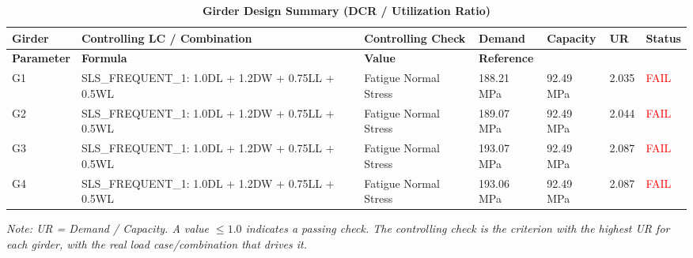 \documentclass[12pt,a4paper]{report}
\numberwithin{table}{chapter}
\numberwithin{figure}{chapter}
\begin{document}
\begin{longtable}{|C{1.6cm}|>{\centering\arraybackslash}p{3.6cm}|C{2.4cm}|C{2.0cm}|C{2.1cm}|C{1.7cm}|C{1.5cm}|}
\caption{\textbf{Girder Design Summary (DCR / Utilization Ratio)}}
\hline
\textbf{Girder} & \textbf{Controlling LC / Combination} & \textbf{Controlling Check} & \textbf{Demand} & \textbf{Capacity} & \textbf{UR} & \textbf{Status} \\[6pt]
\hline
\endfirsthead

\hline

\textbf{Parameter} & \textbf{Formula} & \textbf{Value} & \textbf{Reference} \\[6pt]

\hline

\endhead
G1 & SLS\_\allowbreak{}FREQUENT\_\allowbreak{}1:\allowbreak{} 1.0DL + 1.2DW + 0.75LL + 0.5WL & Fatigue Normal Stress & 188.21 MPa & 92.49 MPa & 2.035 & \textcolor{red}{FAIL} \\[6pt]
\hline
G2 & SLS\_\allowbreak{}FREQUENT\_\allowbreak{}1:\allowbreak{} 1.0DL + 1.2DW + 0.75LL + 0.5WL & Fatigue Normal Stress & 189.07 MPa & 92.49 MPa & 2.044 & \textcolor{red}{FAIL} \\[6pt]
\hline
G3 & SLS\_\allowbreak{}FREQUENT\_\allowbreak{}1:\allowbreak{} 1.0DL + 1.2DW + 0.75LL + 0.5WL & Fatigue Normal Stress & 193.07 MPa & 92.49 MPa & 2.087 & \textcolor{red}{FAIL} \\[6pt]
\hline
G4 & SLS\_\allowbreak{}FREQUENT\_\allowbreak{}1:\allowbreak{} 1.0DL + 1.2DW + 0.75LL + 0.5WL & Fatigue Normal Stress & 193.06 MPa & 92.49 MPa & 2.087 & \textcolor{red}{FAIL} \\[6pt]
\hline
\end{longtable}
\noindent\textit{Note: UR = Demand / Capacity. A value $\leq 1.0$ indicates a passing check. The controlling check is the criterion with the highest UR for each girder, with the real load case/combination that drives it.}

\vspace{1em}
\end{document}
